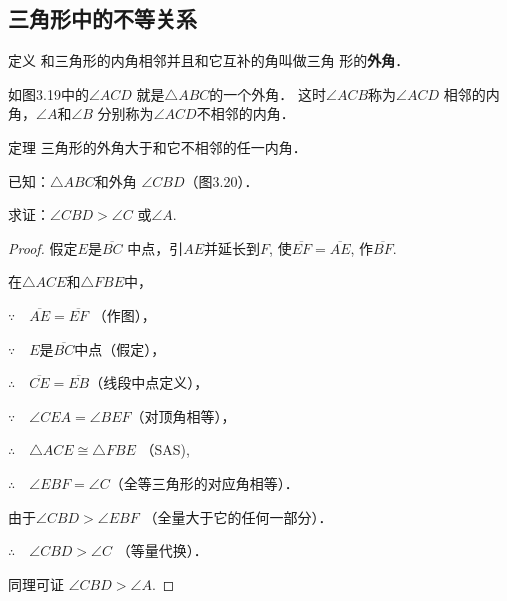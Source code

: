 \subsection{三角形中的不等关系}
\begin{blk}{定义}
    和三角形的内角相邻并且和它互补的角叫做三角
形的\textbf{外角}．
\end{blk}
 
如图3.19中的$\angle ACD$
就是$\triangle ABC$的一个外角．
这时$\angle ACB$称为$\angle ACD$
相邻的内角，$\angle A$和$\angle B$
分别称为$\angle ACD$不相邻的内角．

\begin{blk}{定理}
 三角形的外角大于和它不相邻的任一内角．
\end{blk}

\begin{figure}[htp]\centering
    \begin{minipage}[t]{0.48\textwidth}
    \centering
{}
    \caption{}
    \end{minipage}
    \begin{minipage}[t]{0.48\textwidth}
    \centering
    \caption{}
    \end{minipage}
    \end{figure}

已知：$\triangle ABC$和外角
$\angle CBD$（图3.20）．

求证：$\angle CBD>\angle C$
或$\angle A$.

\begin{proof}
    假定$E$是$\overline{BC}$
中点，引$AE$并延长到$F$, 
使$\overline{EF}=\overline{AE}$, 作$\overline{BF}$.

在$\triangle ACE$和$\triangle FBE$中，

$\because\quad \overline{AE}=\overline{EF}$ （作图），

$\because\quad E$是$\overline{BC}$中点（假定），

$\therefore\quad \overline{CE}=\overline{EB}$（线段中点定义），

$\because\quad \angle CEA=\angle BEF$（对顶角相等），

$\therefore\quad \triangle ACE\cong \triangle FBE$ （SAS),

$\therefore\quad \angle EBF=\angle C$（全等三角形的对应角相等）．

由于$\angle CBD>\angle EBF$ （全量大于它的任何一部分）．

$\therefore\quad \angle CBD>\angle C$ （等量代换）．

同理可证 $\angle CBD> \angle A$.
\end{proof}

